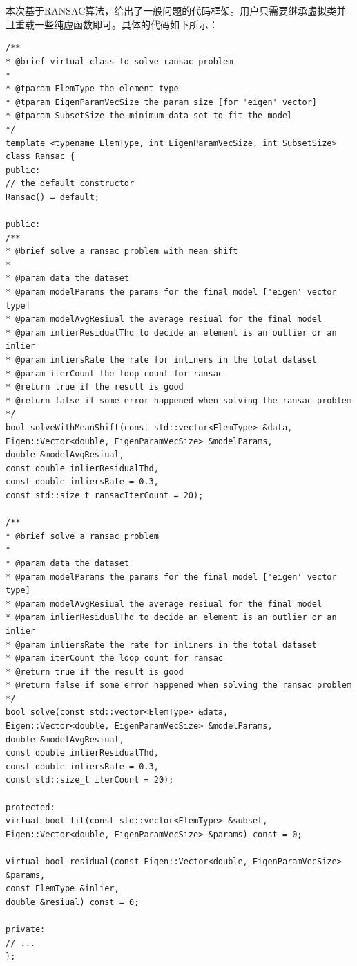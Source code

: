 \documentclass[12pt, twocolumn]{article}
\newcommand{\normf}{\kaishu}
\begin{document}
	\section{\normf{代码框架}}
	本次基于RANSAC算法，给出了一般问题的代码框架。用户只需要继承虚拟类并且重载一些纯虚函数即可。具体的代码如下所示：
		\begin{lstlisting}[label=code2,caption={\normf RANSAC虚拟类}]
/**
* @brief virtual class to solve ransac problem
*
* @tparam ElemType the element type
* @tparam EigenParamVecSize the param size [for 'eigen' vector]
* @tparam SubsetSize the minimum data set to fit the model
*/
template <typename ElemType, int EigenParamVecSize, int SubsetSize>
class Ransac {
public:
// the default constructor
Ransac() = default;

public:
/**
* @brief solve a ransac problem with mean shift
*
* @param data the dataset
* @param modelParams the params for the final model ['eigen' vector type]
* @param modelAvgResiual the average resiual for the final model
* @param inlierResidualThd to decide an element is an outlier or an inlier
* @param inliersRate the rate for inliners in the total dataset
* @param iterCount the loop count for ransac
* @return true if the result is good
* @return false if some error happened when solving the ransac problem
*/
bool solveWithMeanShift(const std::vector<ElemType> &data,
Eigen::Vector<double, EigenParamVecSize> &modelParams,
double &modelAvgResiual,
const double inlierResidualThd,
const double inliersRate = 0.3,
const std::size_t ransacIterCount = 20);

/**
* @brief solve a ransac problem
*
* @param data the dataset
* @param modelParams the params for the final model ['eigen' vector type]
* @param modelAvgResiual the average resiual for the final model
* @param inlierResidualThd to decide an element is an outlier or an inlier
* @param inliersRate the rate for inliners in the total dataset
* @param iterCount the loop count for ransac
* @return true if the result is good
* @return false if some error happened when solving the ransac problem
*/
bool solve(const std::vector<ElemType> &data,
Eigen::Vector<double, EigenParamVecSize> &modelParams,
double &modelAvgResiual,
const double inlierResidualThd,
const double inliersRate = 0.3,
const std::size_t iterCount = 20);

protected:
virtual bool fit(const std::vector<ElemType> &subset,
Eigen::Vector<double, EigenParamVecSize> &params) const = 0;

virtual bool residual(const Eigen::Vector<double, EigenParamVecSize> &params,
const ElemType &inlier,
double &resiual) const = 0;

private:
// ...
};
	\end{lstlisting}
	
\end{document}

